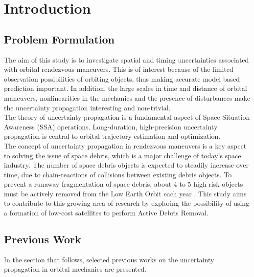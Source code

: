 \section{Introduction}

\subsection{Problem Formulation}

The aim of this study is to investigate spatial and timing uncertainties associated with orbital rendezvous maneuvers. This is of interest because of the limited observation possibilities of orbiting objects, thus making accurate model based prediction important. In addition, the large scales in time and distance of orbital maneuvers, nonlinearities in the mechanics and the presence of disturbances make the uncertainty propagation interesting and non-trivial. \\


The theory of uncertainty propagation is a fundamental aspect of Space Situation Awareness (SSA) operations. Long-duration, high-precision uncertainty propagation is central to orbital trajectory estimation and optimization. \\


The concept of uncertainty propagation in rendezvous maneuvers is a key aspect to solving the issue of space debris, which is a major challenge of today's space industry. The number of space debris objects is expected to steadily increase over time, due to chain-reactions of collisions between existing debris objects. To prevent a runaway fragmentation of space debris, about 4 to 5 high risk objects must be actively removed from the Low Earth Orbit each year \cite{ESA_about_space_debris}. This study aims to contribute to this growing area of research by exploring the possibility of using a formation of low-cost satellites to perform Active Debris Removal. \\


\subsection{Previous Work}

In the section that follows, selected previous works on the uncertainty propagation in orbital mechanics are presented.  \\



